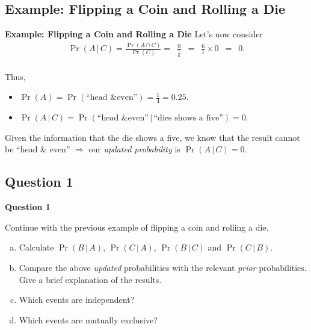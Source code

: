 \documentclass[compress]{beamer}        %
\makeatletter
\newcommand{\tcb}{\textcolor{beamer@blendedblue}}
\makeatother
\begin{document}
\subsection{Example: Flipping a Coin and Rolling a Die}
\begin{frame}{\bf \tcb{Example: Flipping a Coin and Rolling a Die}}
Let's now consider
\begin{align*}
\Pr(A\,|\,C) = \frac{\Pr(A \cap C)}{\Pr(C)} =\,\,\, \frac{0}{\tfrac{1}{6}} \,\,\,=\,\,\, \frac{6}{1} \times 0 \,\,\,=\,\,\, 0.\\[-0.4cm]
\end{align*}

Thus,\\[0.1cm]
\begin{itemize}\itemsep0.4cm
\item $\Pr(A) = \Pr(\text{``head \& even''}) = \tfrac{1}{4} = 0.25$.
\item $\Pr(A\,|\,C) = \Pr(\text{``head \& even''}\,|\,\text{``dies shows a five''}) = 0$.\\[0.8cm]
\end{itemize}

Given the information that the die shows a five, we know that the result cannot be ``head \& even'' $\Rightarrow$ our \emph{updated probability} is $\Pr(A\,|\,C) = 0$.

\end{frame}


\subsection{Question 1}
\begin{frame}{\bf \tcb{Question 1}}

Continue with the previous example of flipping a coin and rolling a die.\\[0.5cm]

\begin{enumerate}[a)]\itemsep0.4cm
\item Calculate $\Pr(B\,|\,A)$, $\Pr(C\,|\,A)$, $\Pr(B\,|\,C)$ and $\Pr(C\,|\,B)$.
\item Compare the above \emph{updated} probabilities with the relevant \emph{prior} probabilities. Give a brief explanation of the results.
\item Which events are independent?
\item Which events are mutually exclusive?
\end{enumerate}

\end{frame}
\end{document}
